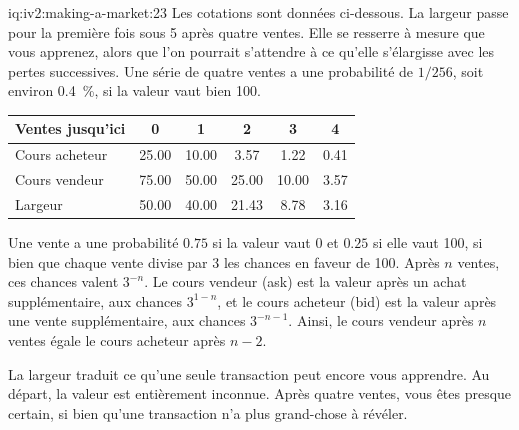 \begin{solution}{iq:iv2:making-a-market:23}
Les cotations sont données ci-dessous. La largeur passe pour la première fois sous 5 après quatre ventes. Elle se resserre à mesure que vous apprenez, alors que l'on pourrait s'attendre à ce qu'elle s'élargisse avec les pertes successives. Une série de quatre ventes a une probabilité de $1/256$, soit environ 0.4~\%, si la valeur vaut bien 100.
\begin{center}\small
\begin{tabular}{@{}lccccc@{}}
Ventes jusqu'ici & 0 & 1 & 2 & 3 & 4 \\ \hline
Cours acheteur & 25.00 & 10.00 & 3.57 & 1.22 & 0.41 \\
Cours vendeur & 75.00 & 50.00 & 25.00 & 10.00 & 3.57 \\
Largeur & 50.00 & 40.00 & 21.43 & 8.78 & 3.16
\end{tabular}
\end{center}

Une vente a une probabilité $0.75$ si la valeur vaut 0 et $0.25$ si elle vaut 100, si bien que chaque vente divise par 3 les chances en faveur de 100. Après $n$ ventes, ces chances valent $3^{-n}$. Le cours vendeur (ask) est la valeur après un achat supplémentaire, aux chances $3^{1-n}$, et le cours acheteur (bid) est la valeur après une vente supplémentaire, aux chances $3^{-n-1}$. Ainsi, le cours vendeur après $n$ ventes égale le cours acheteur après $n - 2$.

La largeur traduit ce qu'une seule transaction peut encore vous apprendre. Au départ, la valeur est entièrement inconnue. Après quatre ventes, vous êtes presque certain, si bien qu'une transaction n'a plus grand-chose à révéler.

\end{solution}

